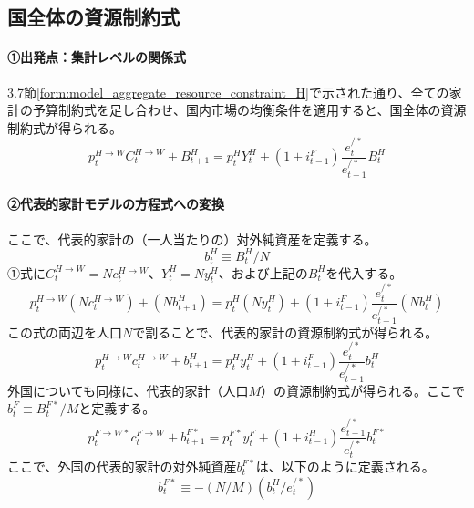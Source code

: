 \subsection{国全体の資源制約式}
\label{sec:chapter3_final_equations_resource}
\paragraph{①出発点：集計レベルの関係式}\label{sec:chapter3_final_equations_resource_origin}
3.7節\eqref{form:model_aggregate_resource_constraint_H}で示された通り、全ての家計の予算制約式を足し合わせ、国内市場の均衡条件を適用すると、国全体の資源制約式が得られる。
\begin{equation}
p_t^{H\to W}C_t^{H\to W}+B_{t+1}^H=p_t^HY_t^H+(1+i_{t-1}^F)\frac{e_t^{/*}}{e_{t-1}^{/*}}B_t^H
\label{form:model_final_equations_resource_agg_restated}
\end{equation}

\paragraph{②代表的家計モデルの方程式への変換}\label{sec:chapter3_final_equations_resource_ra_eq}
ここで、代表的家計の（一人当たりの）対外純資産を定義する。
\begin{equation}
b_t^H\equiv B_t^H/N
\label{form:model_final_equations_resource_ra_b_h_def}
\end{equation}
①式に\(C_t^{H\to W}=Nc_t^{H\to W}\)、\(Y_t^H=Ny_t^H\)、および上記の\(B_t^H\)を代入する。
\begin{equation}
p_t^{H\to W}(Nc_t^{H\to W})+(Nb_{t+1}^H)=p_t^H(Ny_t^H)+(1+i_{t-1}^F)\frac{e_t^{/*}}{e_{t-1}^{/*}}(Nb_t^H)
\label{form:model_final_equations_resource_derivation}
\end{equation}
この式の両辺を人口\(N\)で割ることで、代表的家計の資源制約式が得られる。
\begin{equation}
p_t^{H\to W}c_t^{H\to W}+b_{t+1}^H=p_t^Hy_t^H+(1+i_{t-1}^F)\frac{e_t^{/*}}{e_{t-1}^{/*}}b_t^H
\label{form:model_final_equations_resource_h}
\end{equation}
外国についても同様に、代表的家計（人口\(M\)）の資源制約式が得られる。ここで\(b_t^F\equiv B_t^{F*}/M\)と定義する。
\begin{equation}
p_t^{F\to W*}c_t^{F\to W}+b_{t+1}^{F*}=p_t^{F*}y_t^F+(1+i_{t-1}^H)\frac{e_{t-1}^{/*}}{e_t^{/*}}b_t^{F*}
\label{form:model_final_equations_resource_f}
\end{equation}
ここで、外国の代表的家計の対外純資産\(b_t^{F*}\)は、以下のように定義される。
\begin{equation}
b_t^{F*}\equiv-(N/M)(b_t^H/e_t^{/*})
\label{form:model_final_equations_resource_ra_b_f_def}
\end{equation}

